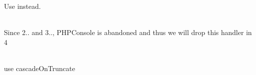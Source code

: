 \begin{DoxyRefList}
\label{deprecated__deprecated000066}%
%
Use  instead.  
\item[Class \doxylink{class_monolog_1_1_handler_1_1_p_h_p_console_handler}{PHPConsole\+Handler} ]\hfill \\
\label{deprecated__deprecated000178}%
%
Since 2.. and 3.., PHPConsole is abandoned and thus we will drop this handler in  4  
\item[Global \doxylink{class_illuminate_1_1_database_1_1_query_1_1_grammars_1_1_postgres_grammar_adbb819df731d8191da0a31fabb2cc6d4}{Postgres\+Grammar\+::cascade\+On\+Trucate} (bool \$value=true)]\hfill \\
\label{deprecated__deprecated000110}%
%
use cascade\+On\+Truncate  
\item[Global \doxylink{class_whoops_1_1_handler_1_1_pretty_page_handler_a1ca1159e28d6afbf818c967879e97ed4}{Pretty\+Page\+Handler\+::get\+Resources\+Path} ()]\hfill \\
\label{deprecated__deprecated000077}%
%
 
\item[Global \doxylink{class_whoops_1_1_handler_1_1_pretty_page_handler_ae06df6d170b9f7217b36b28e56b99e89}{Pretty\+Page\+Handler\+::set\+Resources\+Path} (\$resources\+Path)]\hfill \\
\label{deprecated__deprecated000078}%
%
 

\end{DoxyRefList}
